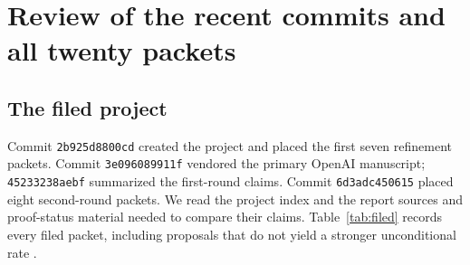 \section{Review of the recent commits and all twenty packets}
\label{sec:review}

\subsection{The filed project}

Commit \texttt{2b925d8800cd} created the project and placed the first seven
refinement packets. Commit \texttt{3e096089911f} vendored the primary OpenAI
manuscript; \texttt{45233238aebf} summarized the first-round claims.
Commit \texttt{6d3adc450615} placed eight second-round packets. We read the
project index and the report sources and proof-status material needed to
compare their claims. Table~\ref{tab:filed} records every filed packet,
including proposals that do not yield a stronger unconditional rate \cite{project}.

